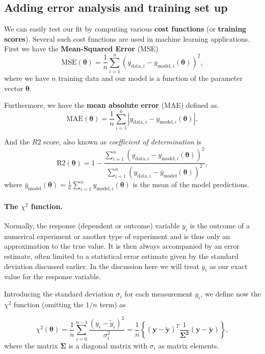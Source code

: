 \documentclass[%
oneside,                 %
final,                   %
10pt]{article}
\newenvironment{block_mdfboxadmon}[1][]{
\begin{block_mdfboxmdframed}[frametitle=#1]
}
{
\end{block_mdfboxmdframed}
}
\begin{document}
\subsection{Adding error analysis and training set up}

We can easily test our fit by computing various \textbf{cost functions} (or \textbf{training scores}). Several such cost functions are used in machine learning applications. First we have the \textbf{Mean-Squared Error} (MSE)
\[
\mathrm{MSE}(\bm{\theta}) = \frac{1}{n} \sum_{i=1}^n \left( y_{\mathrm{data},i} - y_{\mathrm{model},i}(\bm{\theta}) \right)^2,
\]
where we have $n$ training data and our model is a function of the parameter vector $\bm{\theta}$.

Furthermore, we have the \textbf{mean absolute error} (MAE) defined as.
\[
\mathrm{MAE}(\bm{\theta}) = \frac{1}{n} \sum_{i=1}^n \left| y_{\mathrm{data},i} - y_{\mathrm{model},i}(\bm{\theta}) \right|,
\]

And the $R2$ score, also known as \emph{coefficient of determination} is
\[
\mathrm{R2}(\bm{\theta}) = 1 - \frac{\sum_{i=1}^n \left( y_{\mathrm{data},i} - y_{\mathrm{model},i}(\bm{\theta}) \right)^2}{\sum_{i=1}^n \left( y_{\mathrm{data},i} - \bar{y}_\mathrm{model}(\bm{\theta}) \right)^2},
\]
where $\bar{y}_\mathrm{model}(\bm{\theta}) = \frac{1}{n} \sum_{i=1}^n y_{\mathrm{model},i} (\bm{\theta})$ is the mean of the model predictions.


\paragraph{The $\chi^2$ function.}

\begin{block_mdfboxadmon}[]

Normally, the response (dependent or outcome) variable $y_i$ is the
outcome of a numerical experiment or another type of experiment and is
thus only an approximation to the true value. It is then always
accompanied by an error estimate, often limited to a statistical error
estimate given by the standard deviation discussed earlier. In the
discussion here we will treat $y_i$ as our exact value for the
response variable.

Introducing the standard deviation $\sigma_i$ for each measurement
$y_i$, we define now the $\chi^2$ function (omitting the $1/n$ term)
as

\[
\chi^2(\bm{\theta})=\frac{1}{n}\sum_{i=0}^{n-1}\frac{\left(y_i-\tilde{y}_i\right)^2}{\sigma_i^2}=\frac{1}{n}\left\{\left(\bm{y}-\bm{\tilde{y}}\right)^T\frac{1}{\bm{\Sigma^2}}\left(\bm{y}-\bm{\tilde{y}}\right)\right\},
\]
where the matrix $\bm{\Sigma}$ is a diagonal matrix with $\sigma_i$ as matrix elements.
\end{block_mdfboxadmon} %
\end{document}
